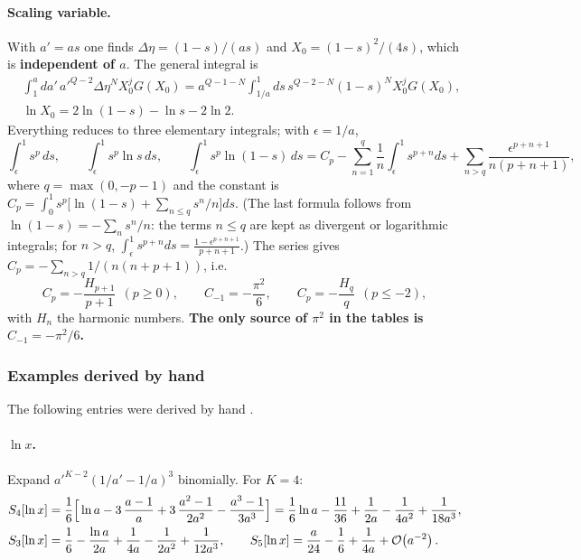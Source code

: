 \paragraph{Scaling variable.} With $a'=as$ one finds $\Delta\eta=(1-s)/(as)$ and $X_0=(1-s)^2/(4s)$, which is \textbf{independent of $a$}. The general integral is
\begin{equation}
\begin{aligned}
&\int_1^a\!da'\,a'^{Q-2}\Delta\eta^NX_0^jG(X_0)=a^{Q-1-N}\int_{1/a}^1\!ds\,s^{Q-2-N}(1-s)^N X_0^jG(X_0),\\
&\ln X_0=2\ln(1-s)-\ln s-2\ln2.
\end{aligned}
\label{eq:ch09-scaling}
\end{equation}
Everything reduces to three elementary integrals; with $\epsilon=1/a$,
\begin{equation}
\int_\epsilon^1 s^p\,ds,\qquad \int_\epsilon^1s^p\ln s\,ds,\qquad
\int_\epsilon^1 s^p\ln(1-s)\,ds=C_p-\sum_{n=1}^{q}\frac1n\int_\epsilon^1\!s^{p+n}ds+\sum_{n>q}\frac{\epsilon^{p+n+1}}{n(p+n+1)},
\label{eq:ch09-elem}
\end{equation}
where $q=\max(0,-p-1)$ and the constant is $C_p=\int_0^1s^p\big[\ln(1-s)+\sum_{n\le q}s^n/n\big]ds$.
(The last formula follows from $\ln(1-s)=-\sum_n s^n/n$: the terms $n\le q$ are kept as divergent or logarithmic integrals; for $n>q$,
$\int_\epsilon^1s^{p+n}ds=\frac{1-\epsilon^{p+n+1}}{p+n+1}$.) The series gives $C_p=-\sum_{n>q}1/(n(n+p+1))$, i.e.
\begin{equation}
C_p=-\frac{H_{p+1}}{p+1}\ \ (p\ge0),\qquad C_{-1}=-\frac{\pi^2}6,\qquad C_p=-\frac{H_q}{q}\ \ (p\le-2),
\label{eq:ch09-Cp}
\end{equation}
with $H_n$ the harmonic numbers. \textbf{The only source of $\pi^2$ in the tables is $C_{-1}=-\pi^2/6$.}

\subsubsection{Examples derived by hand}
The following entries were derived by hand \tD.
\paragraph{$\ln x$.} Expand $a'^{K-2}(1/a'-1/a)^3$ binomially. For $K=4$:
\begin{equation}
\begin{aligned}
S_4[\ln x]&=\frac16\Big[\ln a-3\,\frac{a-1}a+3\,\frac{a^2-1}{2a^2}-\frac{a^3-1}{3a^3}\Big]
=\frac16\ln a-\frac{11}{36}+\frac1{2a}-\frac1{4a^2}+\frac1{18a^3},\\
S_3[\ln x]&=\frac16-\frac{\ln a}{2a}+\frac1{4a}-\frac1{2a^2}+\frac1{12a^3},\qquad
S_5[\ln x]=\frac a{24}-\frac16+\frac1{4a}+\mathcal{O}\!\left(a^{-2}\right).
\end{aligned}
\label{eq:ch09-Sln}
\end{equation}

